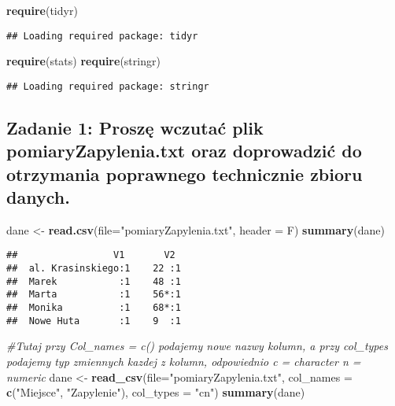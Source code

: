 \documentclass[]{article}
\newenvironment{Shaded}{\begin{snugshade}}{\end{snugshade}}
\newcommand{\CommentTok}[1]{\textcolor[rgb]{0.56,0.35,0.01}{\textit{#1}}}
\newcommand{\DataTypeTok}[1]{\textcolor[rgb]{0.13,0.29,0.53}{#1}}
\newcommand{\KeywordTok}[1]{\textcolor[rgb]{0.13,0.29,0.53}{\textbf{#1}}}
\newcommand{\NormalTok}[1]{#1}
\newcommand{\StringTok}[1]{\textcolor[rgb]{0.31,0.60,0.02}{#1}}
\begin{document}
\begin{Shaded}
\begin{Highlighting}[]
\KeywordTok{require}\NormalTok{(tidyr)}
\end{Highlighting}
\end{Shaded}

\begin{verbatim}
## Loading required package: tidyr
\end{verbatim}

\begin{Shaded}
\begin{Highlighting}[]
\KeywordTok{require}\NormalTok{(stats)}
\KeywordTok{require}\NormalTok{(stringr)}
\end{Highlighting}
\end{Shaded}

\begin{verbatim}
## Loading required package: stringr
\end{verbatim}

\hypertarget{zadanie-1-proszux119-wczutaux107-plik-pomiaryzapylenia.txt-oraz-doprowadziux107-do-otrzymania-poprawnego-technicznie-zbioru-danych.}{%
\subsection{Zadanie 1: Proszę wczutać plik pomiaryZapylenia.txt oraz
doprowadzić do otrzymania poprawnego technicznie zbioru
danych.}\label{zadanie-1-proszux119-wczutaux107-plik-pomiaryzapylenia.txt-oraz-doprowadziux107-do-otrzymania-poprawnego-technicznie-zbioru-danych.}}

\begin{Shaded}
\begin{Highlighting}[]
\NormalTok{dane <-}\StringTok{ }\KeywordTok{read.csv}\NormalTok{(}\DataTypeTok{file=}\StringTok{"pomiaryZapylenia.txt"}\NormalTok{, }\DataTypeTok{header =}\NormalTok{ F)}
\KeywordTok{summary}\NormalTok{(dane)}
\end{Highlighting}
\end{Shaded}

\begin{verbatim}
##                 V1       V2   
##  al. Krasinskiego:1    22 :1  
##  Marek           :1    48 :1  
##  Marta           :1    56*:1  
##  Monika          :1    68*:1  
##  Nowe Huta       :1    9  :1
\end{verbatim}

\begin{Shaded}
\begin{Highlighting}[]
\CommentTok{#Tutaj przy Col_names = c() podajemy nowe nazwy kolumn, a przy col_types podajemy typ zmiennych kazdej z kolumn, odpowiednio c = character n = numeric}
\NormalTok{dane <-}\StringTok{ }\KeywordTok{read_csv}\NormalTok{(}\DataTypeTok{file=}\StringTok{"pomiaryZapylenia.txt"}\NormalTok{, }\DataTypeTok{col_names =}  \KeywordTok{c}\NormalTok{(}\StringTok{"Miejsce"}\NormalTok{, }\StringTok{"Zapylenie"}\NormalTok{), }\DataTypeTok{col_types =} \StringTok{"cn"}\NormalTok{)}
\KeywordTok{summary}\NormalTok{(dane)}
\end{Highlighting}
\end{Shaded}
\end{document}
